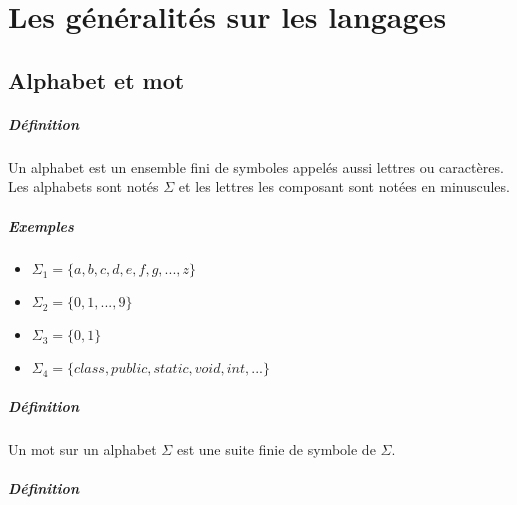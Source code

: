 \chapter{Les généralités sur les langages} %
\label{cha:les_g_n_ralit_s_sur_les_langages}


\section{Alphabet et mot} %
\label{sec:alphabet_et_mot}


\paragraph{Définition} %
\label{par:d_finition}

Un alphabet est un ensemble fini de symboles appelés aussi lettres ou caractères. Les alphabets sont notés $\Sigma$ et les lettres les composant sont notées en minuscules.



\paragraph{Exemples} %
\label{par:exemples}


\begin{itemize}
	\item $\Sigma_1 = \{a,b,c,d,e,f,g,...,z\}$
	\item $\Sigma_2 = \{0,1,...,9\}$
	\item $\Sigma_3 = \{0,1\}$
	\item $\Sigma_4 = \{class,public,static,void,int,...\}$
\end{itemize}




\paragraph{Définition} %
\label{par:d_finition}

Un mot sur un alphabet $\Sigma$ est une suite finie de symbole de $\Sigma$.



\paragraph{Définition} %
\label{par:d_finition}

